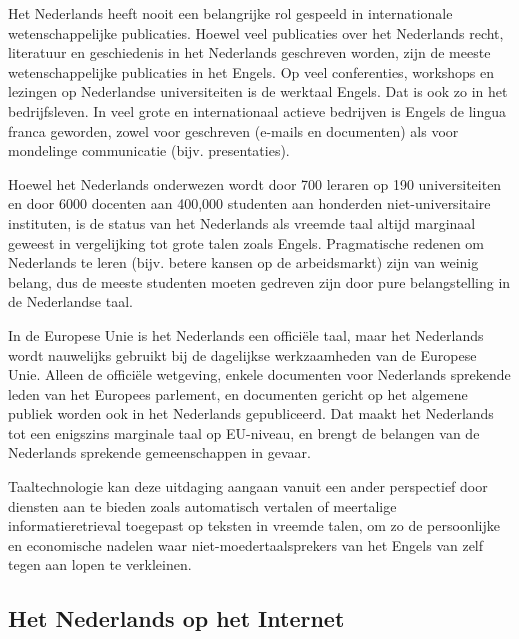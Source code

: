 \documentclass[]{../../metanetpaper}
\begin{document}
\begin{multicols}{2}
    Het Nederlands heeft nooit een belangrijke rol gespeeld in internationale wetenschappelijke publicaties. Hoewel veel publicaties over het Nederlands recht, literatuur en geschiedenis in het Nederlands geschreven worden, zijn de meeste wetenschappelijke publicaties in het Engels. Op veel conferenties, workshops en lezingen op Nederlandse universiteiten is de werktaal Engels. Dat is ook zo in het bedrijfsleven. In veel grote en internationaal actieve bedrijven is Engels de lingua franca geworden, zowel voor geschreven (e-mails en documenten) als voor mondelinge communicatie (bijv. presentaties).


    Hoewel het Nederlands onderwezen wordt door 700 leraren op 190 universiteiten en door 6000 docenten aan 400,000 studenten aan honderden niet-universitaire instituten, is de status van het Nederlands als vreemde taal altijd marginaal geweest in vergelijking tot grote talen zoals Engels. Pragmatische redenen om Nederlands te leren (bijv. betere kansen op de arbeidsmarkt) zijn van weinig belang, dus de meeste studenten moeten gedreven zijn door pure belangstelling in de Nederlandse taal.

    In de Europese Unie is het Nederlands een offici{\"e}le taal, maar het Nederlands wordt nauwelijks gebruikt bij de dagelijkse werkzaamheden van de Europese Unie. Alleen de offici{\"e}le wetgeving, enkele documenten voor Nederlands sprekende leden van het Europees parlement, en documenten gericht op het algemene publiek worden ook in het Nederlands gepubliceerd. Dat maakt het Nederlands tot een enigszins marginale taal op EU-niveau, en brengt de belangen van de Nederlands sprekende gemeenschappen in gevaar.

    Taaltechnologie kan deze uitdaging aangaan vanuit een ander perspectief door diensten aan te bieden zoals automatisch vertalen of meertalige informatieretrieval toegepast op teksten in vreemde talen, om zo de persoonlijke en economische nadelen waar niet-moedertaalsprekers van het Engels van zelf tegen aan lopen te verkleinen.

\subsection{Het Nederlands op het Internet}


\end{multicols}
\end{document}
